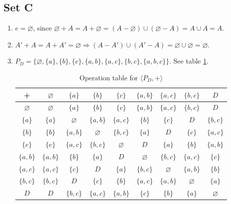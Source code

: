 \documentclass{article}
\let\emptyset\varnothing
\begin{document}
\subsection*{Set C}
\begin{enumerate}
    \item $e = \emptyset$, since $\emptyset + A = A + \emptyset = (A - \emptyset) \cup (\emptyset - A) = A \cup A = A$.
    \item $A' + A = A + A' = \emptyset \Rightarrow (A - A') \cup (A'- A) = \emptyset \cup \emptyset = \emptyset$.
    \item $P_D = \{\emptyset, \{a\}, \{b\}, \{c\}, \{a, b\}, \{a, c\}, \{b, c\}, \{a, b, c\}\}$. See table \ref{tab:powerset-op}.
    \begin{table}[!ht]
        \centering
        \begin{tabular}{c|cccccccc}
        +             & $\emptyset$   & $\{a\}$       & $\{b\}$       & $\{c\}$       & $\{a, b\}$    & $\{a, c\}$    & $\{b, c\}$    & $D$ \\
        \hline
        $\emptyset$   & $\emptyset$   & $\{a\}$       & $\{b\}$       & $\{c\}$       & $\{a, b\}$    & $\{a, c\}$    & $\{b, c\}$    & $D$ \\
        $\{a\}$       & $\{a\}$       & $\emptyset$   & $\{a, b\}$    & $\{a, c\}$    & $\{b\}$       & $\{c\}$       & $D$           & $\{b, c\}$    \\
        $\{b\}$       & $\{b\}$       & $\{a, b\}$    & $\emptyset$   & $\{b, c\}$    & $\{a\}$       & $D$           & $\{c\}$       & $\{a, c\}$    \\
        $\{c\}$       & $\{c\}$       & $\{a, c\}$    & $\{b, c\}$    & $\emptyset$   & $D$           & $\{a\}$       & $\{b\}$       & $\{a, b\}$    \\
        $\{a, b\}$    & $\{a, b\}$    & $\{b\}$       & $\{a\}$       & $D$           & $\emptyset$   & $\{b, c\}$    & $\{a, c\}$    & $\{c\}$       \\
        $\{a, c\}$    & $\{a, c\}$    & $\{c\}$       & $D$           & $\{a\}$       & $\{b, c\}$    & $\emptyset$   & $\{a, b\}$    & $\{b\}$       \\
        $\{b, c\}$    & $\{b, c\}$    & $D$           & $\{c\}$       & $\{b\}$       & $\{a, c\}$    & $\{a, b\}$    & $\emptyset$   & $\{a\}$       \\
        $D$           & $D$           & $\{b, c\}$    & $\{a, c\}$    & $\{a, b\}$    & $\{c\}$       & $\{b\}$       & $\{a\}$       & $\emptyset$  
        \end{tabular}
        \caption{Operation table for $\langle P_D, + \rangle$}
        \label{tab:powerset-op}
    \end{table}
\end{enumerate}
\end{document}
